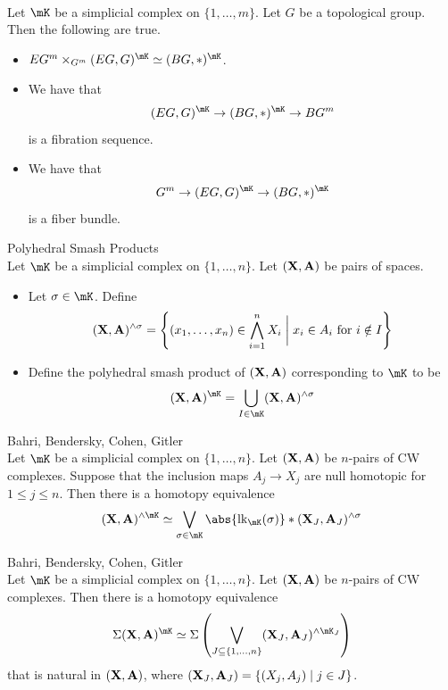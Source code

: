 \documentclass[a4paper]{article}
\begin{document}
\begin{prp}{}{}\\
Let $\mK$ be a simplicial complex on $\{1,\dots,m\}$. Let $G$ be a topological group. Then the following are true. 
\begin{itemize}
\item $EG^m\times_{G^m}(EG,G)^\mK\simeq(BG,\ast)^\mK$. 
\item We have that $$(EG,G)^\mK\to(BG,\ast)^\mK\to BG^m$$ is a fibration sequence. 
\item We have that $$G^m\to(EG,G)^\mK\to(BG,\ast)^\mK$$ is a fiber bundle. 
\end{itemize}
\end{prp}

\begin{defn}{Polyhedral Smash Products}{}\\
Let $\mK$ be a simplicial complex on $\{1,\dots,n\}$. Let $(\bold{X},\bold{A})$ be pairs of spaces. 
\begin{itemize}
\item Let $\sigma\in\mK$. Define $$(\bold{X},\bold{A})^{\wedge\sigma}=\left\{(x_1,\dots,x_n)\in\bigwedge_{i=1}^nX_i\;\bigg{|}\;x_i\in A_i\text{ for }i\notin I\right\}$$
\item Define the polyhedral smash product of $(\bold{X},\bold{A})$ corresponding to $\mK$ to be $$(\bold{X},\bold{A})^\mK=\bigcup_{I\in\mK}(\bold{X},\bold{A})^{\wedge\sigma}$$
\end{itemize}
\end{defn}

\begin{thm}{Bahri, Bendersky, Cohen, Gitler}{}\\
Let $\mK$ be a simplicial complex on $\{1,\dots,n\}$. Let $(\bold{X},\bold{A})$ be $n$-pairs of CW complexes. Suppose that the inclusion maps $A_j\to X_j$ are null homotopic for $1\leq j\leq n$. Then there is a homotopy equivalence $$(\bold{X},\bold{A})^{\wedge\mK}\simeq\bigvee_{\sigma\in\mK}\abs{\text{lk}_\mK(\sigma)}\ast(\bold{X}_J,\bold{A}_J)^{\wedge\sigma}$$
\end{thm}

\begin{thm}{Bahri, Bendersky, Cohen, Gitler}{}\\
Let $\mK$ be a simplicial complex on $\{1,\dots,n\}$. Let $(\bold{X},\bold{A})$ be $n$-pairs of CW complexes. Then there is a homotopy equivalence $$\Sigma(\bold{X},\bold{A})^\mK\simeq\Sigma\left(\bigvee_{J\subseteq\{1,\dots,n\}}(\bold{X}_J,\bold{A}_J)^{\wedge\mK_J}\right)$$ that is natural in $(\bold{X},\bold{A})$, where $(\bold{X}_J,\bold{A}_J)=\{(X_j,A_j)\;|\;j\in J\}$. 
\end{thm}
\end{document}

